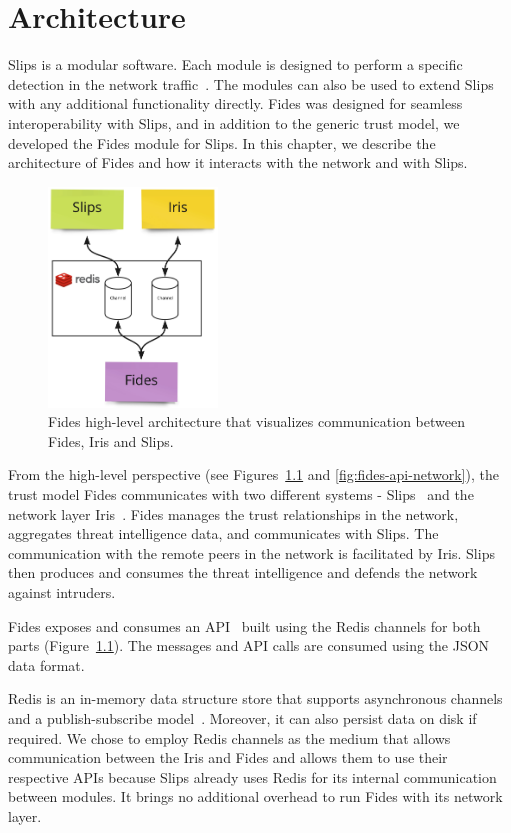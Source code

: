\chapter{Architecture}
\label{ch:architecture}
Slips is a modular software. Each module is designed to perform a specific detection in the network traffic~\cite{slips}.
The modules can also be used to extend Slips with any additional functionality directly. 
Fides was designed for seamless interoperability with Slips, and in addition to the generic trust model, we developed the Fides module for Slips.
In this chapter, we describe the architecture of Fides and how it interacts with the network and with Slips.

\begin{figure}[ht]
    \centering
    \includegraphics[width=0.4\textwidth]{assets/redis_channels.jpeg}
    \caption{Fides high-level architecture that visualizes communication between Fides, Iris and Slips.}
    \label{fig:high-level-architecture}
\end{figure}

From the high-level perspective (see Figures~\ref{fig:high-level-architecture} and \ref{fig:fides-api-network}), the trust model Fides communicates with two different systems - Slips~\cite{slips} and the network layer Iris~\cite{nl}.
Fides manages the trust relationships in the network, aggregates threat intelligence data, and communicates with Slips. The communication with the remote peers in the network is facilitated by Iris. 
Slips then produces and consumes the threat intelligence and defends the network against intruders.

Fides exposes and consumes an API~\cite{api} built using the Redis channels for both parts (Figure~\ref{fig:high-level-architecture}).
The messages and API calls are consumed using the JSON~\cite{json} data format.

Redis is an in-memory data structure store that supports asynchronous channels and a publish-subscribe model~\cite{redis}. Moreover, it can also persist data on disk if required.
We chose to employ Redis channels as the medium that allows communication between the Iris and Fides and allows them to use their respective APIs because Slips already uses Redis for its internal communication between modules. It brings no additional overhead to run Fides with its network layer.



